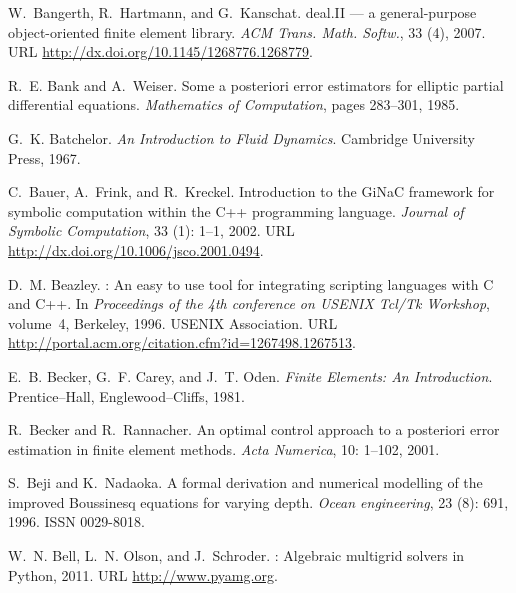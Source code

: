\begin{thebibliography}{467}
W.~Bangerth, R.~Hartmann, and G.~Kanschat.
\newblock deal.{II} --- a general-purpose object-oriented finite element
  library.
\newblock \emph{ACM Trans. Math. Softw.}, 33 (4), 2007.
\newblock URL \url{http://dx.doi.org/10.1145/1268776.1268779}.

R.~E. Bank and A.~Weiser.
\newblock Some a posteriori error estimators for elliptic partial differential
  equations.
\newblock \emph{Mathematics of Computation}, pages 283--301, 1985.

G.~K. Batchelor.
\newblock \emph{An Introduction to Fluid Dynamics}.
\newblock Cambridge University Press, 1967.

C.~Bauer, A.~Frink, and R.~Kreckel.
\newblock Introduction to the {GiNaC} framework for symbolic computation within
  the {C++} programming language.
\newblock \emph{Journal of Symbolic Computation}, 33 (1):
  1--1, 2002.
\newblock URL \url{http://dx.doi.org/10.1006/jsco.2001.0494}.

D.~M. Beazley.
: {A}n easy to use tool for integrating scripting languages
  with {C} and {C++}.
\newblock In \emph{Proceedings of the 4th conference on USENIX Tcl/Tk
  Workshop}, volume~4, Berkeley, 1996. USENIX Association.
\newblock URL \url{http://portal.acm.org/citation.cfm?id=1267498.1267513}.

E.~B. Becker, G.~F. Carey, and J.~T. Oden.
\newblock \emph{Finite Elements: An Introduction}.
\newblock Prentice--Hall, Englewood--Cliffs, 1981.

R.~Becker and R.~Rannacher.
\newblock An optimal control approach to a posteriori error estimation in
  finite element methods.
\newblock \emph{Acta Numerica}, 10: 1--102, 2001.

S.~Beji and K.~Nadaoka.
\newblock A formal derivation and numerical modelling of the improved
  {B}oussinesq equations for varying depth.
\newblock \emph{Ocean engineering}, 23 (8): 691, 1996.
\newblock ISSN 0029-8018.

W.~N. Bell, L.~N. Olson, and J.~Schroder.
: {A}lgebraic multigrid solvers in {P}ython, 2011.
\newblock URL \url{http://www.pyamg.org}.


\end{thebibliography}
